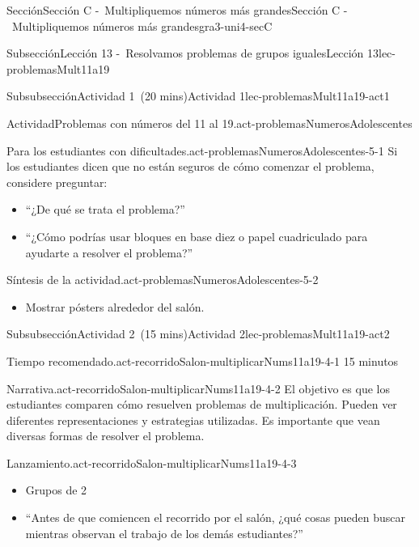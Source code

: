 \documentclass[oneside,10pt,]{article}
\begin{document}
\begin{sectionptx}{Sección}{Sección C -~Multipliquemos números más grandes}{}{Sección C -~Multipliquemos números más grandes}{}{}{gra3-uni4-secC}
\begin{subsectionptx}{Subsección}{Lección 13 -~Resolvamos problemas de grupos iguales}{}{Lección 13}{}{}{lec-problemasMult11a19}
\begin{subsubsectionptx}{Subsubsección}{Actividad 1~(20 mins)}{}{Actividad 1}{}{}{lec-problemasMult11a19-act1}
\begin{activity}{Actividad}{Problemas con números del 11 al 19.}{act-problemasNumerosAdolescentes}
\end{activity}%
\par
\begin{paragraphs}{Para los estudiantes con dificultades.}{act-problemasNumerosAdolescentes-5-1}%
Si los estudiantes dicen que no están seguros de cómo comenzar el problema, considere preguntar:%
%
\begin{itemize}[label=\textbullet]
\item{}``¿De qué se trata el problema?''%
\item{}``¿Cómo podrías usar bloques en base diez o papel cuadriculado para ayudarte a resolver el problema?''%
\end{itemize}
\end{paragraphs}%
\begin{paragraphs}{Síntesis de la actividad.}{act-problemasNumerosAdolescentes-5-2}%
%
\begin{itemize}[label=\textbullet]
\item{}Mostrar pósters alrededor del salón.%
\end{itemize}
\end{paragraphs}%
\end{subsubsectionptx}
%
%
\typeout{************************************************}
\typeout{************************************************}
%
\begin{subsubsectionptx}{Subsubsección}{Actividad 2~(15 mins)}{}{Actividad 2}{}{}{lec-problemasMult11a19-act2}
\par
\begin{paragraphs}{Tiempo recomendado.}{act-recorridoSalon-multiplicarNums11a19-4-1}%
15 minutos%
\end{paragraphs}%
\begin{paragraphs}{Narrativa.}{act-recorridoSalon-multiplicarNums11a19-4-2}%
El objetivo es que los estudiantes comparen cómo resuelven problemas de multiplicación. Pueden ver diferentes representaciones y estrategias utilizadas. Es importante que vean diversas formas de resolver el problema.%
\end{paragraphs}%
\begin{paragraphs}{Lanzamiento.}{act-recorridoSalon-multiplicarNums11a19-4-3}%
%
\begin{itemize}[label=\textbullet]
\item{}Grupos de 2%
\item{}``Antes de que comiencen el recorrido por el salón, ¿qué cosas pueden buscar mientras observan el trabajo de los demás estudiantes?''%

\end{itemize}
\end{paragraphs}
\end{subsubsectionptx}
\end{subsectionptx}
\end{sectionptx}
\end{document}
